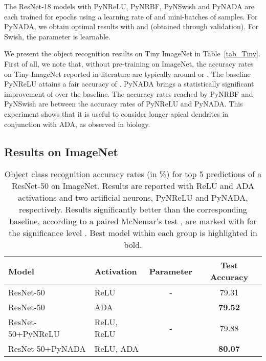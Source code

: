 \documentclass[pdflatex,sn-mathphys]{sn-jnl}
\theoremstyle{thmstyleone}
\theoremstyle{thmstyletwo}\newtheorem{example}{Example}\newtheorem{remark}{Remark}
\theoremstyle{thmstylethree}\newtheorem{definition}{Definition}\DeclareMathOperator{\sinc}{sinc}
\begin{document}
The ResNet-18 models with PyNReLU, PyNRBF, PyNSwish and PyNADA are each trained for  epochs using a learning rate of  and mini-batches of  samples. 
For PyNADA, we obtain optimal results with  and  (obtained through validation). For Swish, the parameter  is learnable.

We present the object recognition results on Tiny ImageNet in Table~\ref{tab_Tiny}. First of all, we note that, without pre-training on ImageNet, the accuracy rates on Tiny ImageNet reported in literature are typically around  or . The baseline PyNReLU attains a fair accuracy of . PyNADA brings a statistically significant improvement of  over the baseline. The accuracy rates reached by PyNRBF and PyNSwish are between the accuracy rates of PyNReLU and PyNADA. This experiment shows that it is useful to consider longer apical dendrites in conjunction with ADA, as observed in biology.

\subsection{Results on ImageNet}
\label{sec_results_imagenet}

\begin{table*}[!t]
\caption{Object class recognition accuracy rates (in \%) for top 5 predictions of a ResNet-50 on ImageNet. Results are reported with ReLU and ADA activations and two artificial neurons, PyNReLU and PyNADA, respectively. Results significantly better than the corresponding baseline, according to a paired McNemar's test \citep{Dietterich-NC-1998}, are marked with  for the significance level . Best model within each group is highlighted in bold.}
\label{tab_ImageNet}
\small{
\begin{center} 
\begin{tabular}{llcc}
\toprule
{\bf Model}                           & {\bf Activation}        & {\bf Parameter}             & {\bf Test Accuracy}\\
\midrule
ResNet-50                   & ReLU 	                    & - 	                &  79.31\\
ResNet-50                   & ADA 	                    &  	                &  {\bf 79.52} \\
\midrule
ResNet-50+PyNReLU           & ReLU, ReLU 	                & - 	                &  79.88 \\
ResNet-50+PyNADA           & ReLU, ADA 	                &  	                & {\bf 80.07} \\

\bottomrule
\end{tabular}
\end{center}
}
\end{table*}
\end{document}
